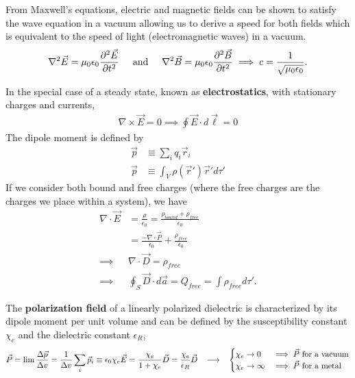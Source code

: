 From Maxwell's equations, electric and magnetic fields can be shown to satisfy the wave equation in a vacuum allowing us to derive a speed for both fields which is equivalent to the speed of light (electromagnetic waves) in a vacuum.
\begin{align}
	\nabla^2 \vec{E} = \mu_0\epsilon_0 \frac{\partial^2 \vec{E}}{\partial t^2} \andspace{0.5cm} \nabla^2 \vec{B} = \mu_0\epsilon_0 \frac{\partial^2 \vec{B}}{\partial t^2} \implies c=\frac{1}{\sqrt{\mu_0\epsilon_0}}.
\end{align}
\begin{multicols}{2}
In the special case of a steady state, known as \textbf{electrostatics}, with stationary charges and currents, \begin{align}
 \nabla \times \vec{E} = 0 \implies \oint \vec{E} \cdot d\vec{\ell} = 0 
\end{align}	
The dipole moment is defined by
\begin{align}
	\vec{p} &\equiv \sum_{i}^{}q_i \vec{r}_i \\ \vec{p} &\equiv \int_V \rho(\vec{r}')\vec{r}' d\tau'
\end{align}
If we consider both bound and free charges (where the free charges are the charges we place within a system), we have
\begin{align}
	\nabla \cdot \vec{E} &= \frac{\rho}{\epsilon_0} = \frac{\rho_{bound}+\rho_{free}}{\epsilon_0} \\ &= \frac{-\nabla \cdot \vec{P}}{\epsilon_0}+\frac{\rho_{free}}{\epsilon_0} \\ \implies &\nabla \cdot \vec{D} = \rho_{free} \\ \implies &\oint_S \vec{D} \cdot d\vec{a} = Q_{free} = \int \rho_{free} d\tau'.
\end{align}
\end{multicols}
The \textbf{polarization field} of a linearly polarized dielectric is characterized by its dipole moment per unit volume and can be defined by the susceptibility constant $\chi_e$ and the dielectric constant $\epsilon_R$,
\begin{align}
	\vec{P} =\lim \frac{\Delta \vec{p}}{\Delta v} = \frac{1}{\Delta v}\sum_{i}\vec{p}_i\equiv \epsilon_0 \chi_e \vec{E}  = \frac{\chi_e}{1+\chi_e}\vec{D} = \frac{\chi_e}{\epsilon_R}\vec{D}\hspace{0.3cm}\longrightarrow \hspace{0.3cm}\begin{cases}
		\chi_e \rightarrow 0 & \implies \vec{P} \textrm{ for a vacuum} \\ \chi_e \rightarrow \infty & \implies \vec{P} \textrm{ for a metal}
		\end{cases}
\end{align}

